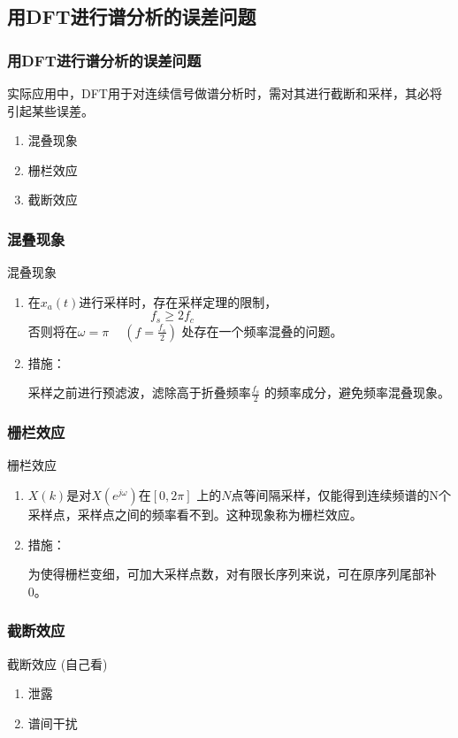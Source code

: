 \documentclass[notheorems,compress,mathserif,table]{beamer}
\begin{document}
\subsection{用DFT进行谱分析的误差问题}
\begin{frame}[shrink]\frametitle{用DFT进行谱分析的误差问题}%

 实际应用中，DFT用于对连续信号做谱分析时，需对其进行截断和采样，其必将引起某些误差。
\begin{enumerate}
  \item 混叠现象
  \item 栅栏效应
  \item 截断效应
\end{enumerate}

\end{frame}
%
%
\begin{frame}[shrink]\frametitle{混叠现象}%

 混叠现象  \par
     \begin{enumerate}
       \item  在$x_a(t)$进行采样时，存在采样定理的限制，
              $$f_s \geq 2 f_c\quad\qquad\qquad\qquad\qquad\qquad$$
              否则将在$\omega = \pi\quad\:$$(f=\frac{f_s}{2})$ 处存在一个频率混叠的问题。
       \item  措施：\par
              采样之前进行预滤波，滤除高于折叠频率$\frac{f_s}{2}$ 的频率成分，避免频率混叠现象。
     \end{enumerate}
\end{frame}
%
%
%
\begin{frame}[shrink]\frametitle{栅栏效应}%
 栅栏效应
     \begin{enumerate}
       \item  $X(k)$是对$X(e^{j\omega})$在$[0,2\pi]$ 上的$N$点等间隔采样，仅能得到连续频谱的N个采样点，采样点之间的频率看不到。这种现象称为栅栏效应。
       \item  措施：\par 为使得栅栏变细，可加大采样点数，对有限长序列来说，可在原序列尾部补0。
     \end{enumerate}
\end{frame}
%
%
%
%
\begin{frame}[shrink]\frametitle{截断效应}%
   截断效应  \qquad(自己看)
  \begin{enumerate}
    \item 泄露
    \item 谱间干扰
  \end{enumerate}

\end{frame}
\end{document}
